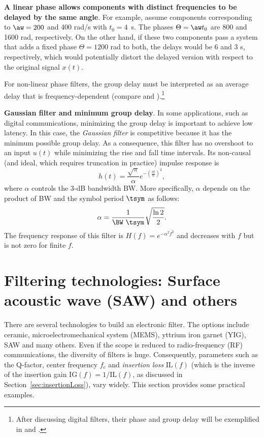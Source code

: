 \bExample \textbf{A linear phase allows components with distinct frequencies to be delayed by the same angle}.
For example, assume components corresponding to $\aw=200$ and 400 rad/s with $t_0=4$~s. The phases $\Theta = \aw t_0$ are 800 and 1600 rad, respectively. On the other hand, if these two components pass a system that adds a fixed phase $\Theta=1200$ rad to both, the delays would be 6 and 3 s, respectively, which would potentially distort the delayed version with respect to the original signal $x(t)$. 
\eExample 

For non-linear phase filters, the group delay must be interpreted as an average delay that is frequency-dependent (compare  and ).\footnote{After discussing digital filters, their phase and group delay will be exemplified in
 and .}

\bExample \textbf{Gaussian filter and minimum group delay}.
In some applications, such as digital communications, minimizing the group delay is important to achieve low latency. In this case, the \emph{Gaussian filter} is competitive because it has
the minimum possible group delay. As a consequence, this filter has no overshoot to an input $u(t)$ while minimizing the rise and fall time intervals. Its non-causal (and ideal, which requires truncation in practice) impulse response is
\begin{equation}
h(t) = \frac{\sqrt{\pi}}{\alpha} e^{-\left( \frac{\pi t}{\alpha} \right)^2},
\label{eq:gaussianFilterImpulseResponse}
\end{equation}
where $\alpha$ controls the 3-dB bandwidth BW. More specifically, $\alpha$ depends on the product of BW and the symbol period $\tsym$ as follows:
\begin{equation}
\alpha = \frac{1}{\BW~\tsym} \sqrt{\frac{\ln 2}{2}}.
\end{equation}
The frequency response of this filter is $H(f) = e^{- \alpha^2 f^2}$ and decreases with $f$ but is not zero for finite $f$.
\eExample 

\section{{\akadvanced} Filtering technologies: Surface acoustic wave (SAW) and others}
\label{sec:filteringTechnologies}

There are several technologies to build an electronic filter. 
The options include ceramic, microelectromechanical system (MEMS), yttrium iron garnet (YIG), SAW and many others. Even if the scope is reduced to radio-frequency (RF) communications, the diversity of filters is huge. Consequently, parameters such as the Q-factor, center frequency $f_c$ and \emph{insertion loss} $\textrm{IL}(f)$ (which is the inverse of the insertion gain $\textrm{IG}(f)=1/\textrm{IL}(f)$, as discussed in Section~\ref{sec:insertionLoss}), vary widely. This section
provides some practical examples.

